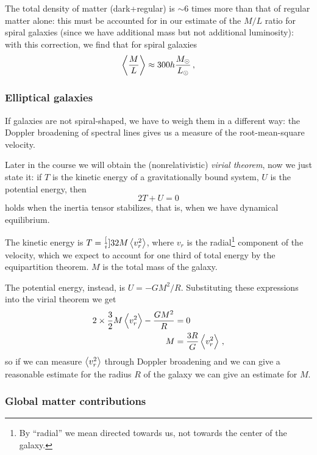 \documentclass[main.tex]{subfiles}
\begin{document}
The total density of matter (dark+regular) is \(\sim 6\) times more than that of regular matter alone: this must be accounted for in our estimate of the \(M/L\) ratio for spiral galaxies (since we have additional mass but not additional luminosity):
with this correction, we find that for spiral galaxies
%
\begin{align}
\expval{\frac{M}{L}} \approx 300 h \frac{M_{\odot}}{L_{\odot}}
\,,
\end{align}
%

\subsubsection{Elliptical galaxies}

If galaxies are not spiral-shaped, we have to weigh them in a different way: the Doppler broadening of spectral lines gives us a measure of the root-mean-square velocity.

Later in the course we will obtain the (nonrelativistic) \emph{virial theorem}, now we just state it: if \(T\) is the kinetic energy of a gravitationally bound system, \(U\) is the potential energy, then
%
\begin{equation}
  2T + U = 0
\end{equation}
%
holds when the inertia tensor stabilizes, that is, when we have dynamical equilibrium.

The kinetic energy is \(T = \frac[i]{3}{2} M \expval{v_r^2} \), where \(v_r\) is the radial\footnote{By ``radial'' we mean directed towards us, not towards the center of the galaxy.}
component of the velocity, which we expect to account for one third of total energy by the equipartition theorem.
\(M\) is the total mass of the galaxy.

The potential energy, instead, is \(U = - G M^2 /R\). Substituting these expressions into the virial theorem we get
%
\begin{align}
2 \times \frac{3}{2} M \expval{v_r^2} - \frac{GM^2}{R} &= 0  \\
M &= \frac{3R}{G} \expval{v_r^2}
\,,
\end{align}
%
so if we can measure \(\expval{v_r^2}\) through Doppler broadening and we can give a reasonable estimate for the radius \(R\) of the galaxy we can give an estimate for \(M\).

\subsubsection{Global matter contributions}
\end{document}
